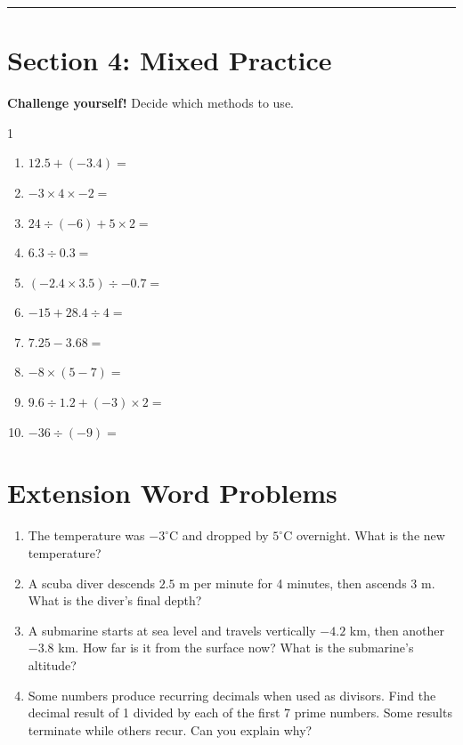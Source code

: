 \documentclass[12pt,a4paper]{article}
\begin{document}
\vspace{1em}
\hrule
\vspace{1em}


\section*{Section 4: Mixed Practice}

\textbf{Challenge yourself!} Decide which methods to use.

\begin{multicols}{1}
\begin{enumerate}
\item $12.5 + (-3.4) =$ \
\vspace{1em}
\item $-3 \times 4 \times -2 =$ \
\vspace{1em}
\item $24 \div (-6) + 5 \times 2 =$ \
\vspace{1em}
\item $6.3 \div 0.3 =$ \
\vspace{1em}
\item $(-2.4 \times 3.5) \div -0.7 =$ \
\vspace{1em}
\item $-15 + 28.4 \div 4 =$ \
\vspace{1em}
\item $7.25 - 3.68 =$ \
\vspace{1em}
\item $-8 \times (5 - 7) =$ \
\vspace{1em}
\item $9.6 \div 1.2 + (-3) \times 2 =$ \
\vspace{1em}
\item $-36 \div (-9) =$ \
\vspace{1em}
\end{enumerate}
\end{multicols}

\section*{Extension Word Problems}

\begin{enumerate}
    \item The temperature was $-3^\circ$C and dropped by $5^\circ$C overnight. What is the new temperature?
    \vspace{2em}
    \item A scuba diver descends $2.5$ m per minute for 4 minutes, then ascends $3$ m. What is the diver’s final depth?
    \vspace{2em}
    \item A submarine starts at sea level and travels vertically $-4.2$ km, then another $-3.8$ km. How far is it from the surface now? What is the submarine's altitude?
    \vspace{2em}
    \item Some numbers produce recurring decimals when used as divisors. Find the decimal result of 1 divided by each of the first 7 prime numbers. Some results terminate while others recur. Can you explain why?
\end{enumerate}
\end{document}
